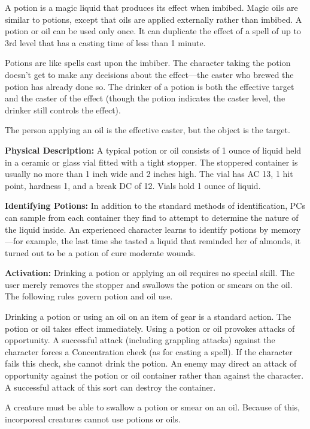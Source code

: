 A potion is a magic liquid that produces its effect when imbibed. Magic oils are similar to potions, except that oils are applied externally rather than imbibed. A potion or oil can be used only once. It can duplicate the effect of a spell of up to 3rd level that has a casting time of less than 1 minute.

Potions are like spells cast upon the imbiber. The character taking the potion doesn't get to make any decisions about the effect---the caster who brewed the potion has already done so. The drinker of a potion is both the effective target and the caster of the effect (though the potion indicates the caster level, the drinker still controls the effect).

The person applying an oil is the effective caster, but the object is the target.

\textbf{Physical Description:} A typical potion or oil consists of 1 ounce of liquid held in a ceramic or glass vial fitted with a tight stopper. The stoppered container is usually no more than 1 inch wide and 2 inches high. The vial has AC 13, 1 hit point, hardness 1, and a break DC of 12. Vials hold 1 ounce of liquid.

\textbf{Identifying Potions:} In addition to the standard methods of identification, PCs can sample from each container they find to attempt to determine the nature of the liquid inside. An experienced character learns to identify potions by memory---for example, the last time she tasted a liquid that reminded her of almonds, it turned out to be a potion of cure moderate wounds.

\textbf{Activation:} Drinking a potion or applying an oil requires no special skill. The user merely removes the stopper and swallows the potion or smears on the oil. The following rules govern potion and oil use.

Drinking a potion or using an oil on an item of gear is a standard action. The potion or oil takes effect immediately. Using a potion or oil provokes attacks of opportunity. A successful attack (including grappling attacks) against the character forces a Concentration check (as for casting a spell). If the character fails this check, she cannot drink the potion. An enemy may direct an attack of opportunity against the potion or oil container rather than against the character. A successful attack of this sort can destroy the container.

A creature must be able to swallow a potion or smear on an oil. Because of this, incorporeal creatures cannot use potions or oils.

